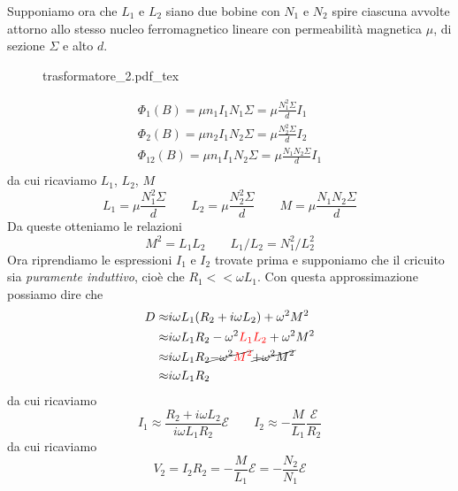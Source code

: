 \documentclass[x11names]{report}
\newcommand{\incfig}[1]{%
	{#1.pdf_tex}
}
\begin{document}
\noindent
Supponiamo ora che \(L_1\) e \(L_2\) siano due bobine con \(N_1\) e \(N_2\) spire ciascuna avvolte attorno allo stesso nucleo ferromagnetico lineare con permeabilità magnetica \(\mu\), di sezione \(\Sigma\) e alto \(d\).
\begin{figure}[H]
	\centering
	\incfig{trasformatore_2}
\end{figure}
\begin{gather*}
	\Phi_1(B) = \mu n_1 I_1 N_1 \Sigma = \mu\frac{N_1^2\Sigma}{d} I_1\\ 
	\Phi_2(B) = \mu n_2 I_1 N_2 \Sigma = \mu\frac{N_2^2\Sigma}{d} I_2\\ 
	\Phi_{12}(B)= \mu n_1 I_1 N_2 \Sigma = \mu\frac{N_1N_2\Sigma}{d} I_1\\ 
\end{gather*}
da cui ricaviamo \(L_1\), \(L_2\), \(M\)
\[
L_1 = \mu\frac{N_1^2\Sigma}{d} \qquad L_2 = \mu\frac{N_2^2\Sigma}{d} \qquad M = \mu\frac{N_1N_2\Sigma}{d}
\]
Da queste otteniamo le relazioni
\[
\boxed{M^2 = L_1L_2} \qquad \boxed{L_1/L_2 = N_1^2/L_2^2}
\]
Ora riprendiamo le espressioni \(I_1\) e \(I_2\) trovate prima e supponiamo che il cricuito sia \textit{puramente induttivo}, cioè che \(R_1 << \omega L_1\). Con questa approssimazione possiamo dire che
\begin{align*}
	D \approx& i\omega L_1(R_2 +i \omega L_2) + \omega^2M^2 \\
	  \approx& i\omega L_1R_2 - \omega^2 \textcolor{red}{L_1L_2} + \omega^2M^2 \\
	  \approx& i\omega L_1R_2 \cancel{- \omega^2 \textcolor{red}{M^2}} \cancel{+ \omega^2M^2} \\
	  \approx& i\omega L_1R_2 
\end{align*}
da cui ricaviamo
\[
I_1 \approx \frac{R_2 + i\omega L_2}{i\omega L_1R_2}\mathcal{E} \qquad I_2 \approx -\frac{M}{L_1}\frac{\mathcal{E}}{R_2}
\]
da cui ricaviamo 
\[
V_2 = I_2R_2 = -\frac{M}{L_1}\mathcal{E} = -\frac{N_2}{N_1}\mathcal{E}
\]



\end{document}
